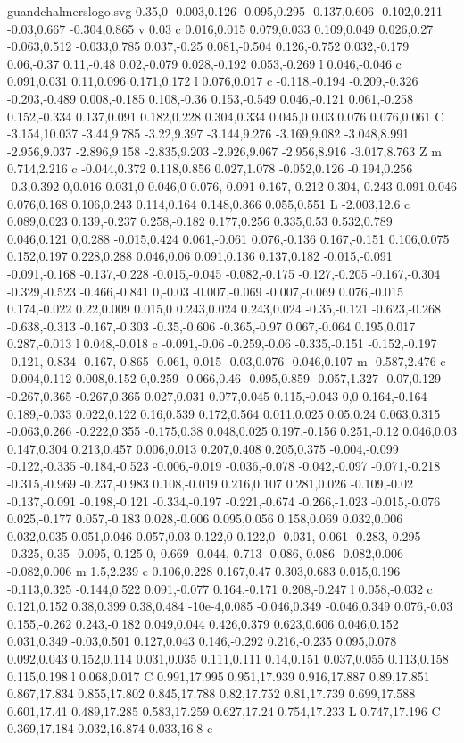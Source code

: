 \begin{filecontents}[noheader]{guandchalmerslogo.svg}
0.35,0 -0.003,0.126 -0.095,0.295 -0.137,0.606 -0.102,0.211 -0.03,0.667 -0.304,0.865 v 0.03 c 0.016,0.015 0.079,0.033 0.109,0.049 0.026,0.27 -0.063,0.512 -0.033,0.785 0.037,-0.25 0.081,-0.504 0.126,-0.752 0.032,-0.179 0.06,-0.37 0.11,-0.48 0.02,-0.079 0.028,-0.192 0.053,-0.269 l 0.046,-0.046 c 0.091,0.031 0.11,0.096 0.171,0.172 l 0.076,0.017 c -0.118,-0.194 -0.209,-0.326 -0.203,-0.489 0.008,-0.185 0.108,-0.36 0.153,-0.549 0.046,-0.121 0.061,-0.258 0.152,-0.334 0.137,0.091 0.182,0.228 0.304,0.334 0.045,0 0.03,0.076 0.076,0.061 C -3.154,10.037 -3.44,9.785 -3.22,9.397 -3.144,9.276 -3.169,9.082 -3.048,8.991 -2.956,9.037 -2.896,9.158 -2.835,9.203 -2.926,9.067 -2.956,8.916 -3.017,8.763 Z m 0.714,2.216 c -0.044,0.372 0.118,0.856 0.027,1.078 -0.052,0.126 -0.194,0.256 -0.3,0.392 0,0.016 0.031,0 0.046,0 0.076,-0.091 0.167,-0.212 0.304,-0.243 0.091,0.046 0.076,0.168 0.106,0.243 0.114,0.164 0.148,0.366 0.055,0.551 L -2.003,12.6 c 0.089,0.023 0.139,-0.237 0.258,-0.182 0.177,0.256 0.335,0.53 0.532,0.789 0.046,0.121 0,0.288 -0.015,0.424 0.061,-0.061 0.076,-0.136 0.167,-0.151 0.106,0.075 0.152,0.197 0.228,0.288 0.046,0.06 0.091,0.136 0.137,0.182 -0.015,-0.091 -0.091,-0.168 -0.137,-0.228 -0.015,-0.045 -0.082,-0.175 -0.127,-0.205 -0.167,-0.304 -0.329,-0.523 -0.466,-0.841 0,-0.03 -0.007,-0.069 -0.007,-0.069 0.076,-0.015 0.174,-0.022 0.22,0.009 0.015,0 0.243,0.024 0.243,0.024 -0.35,-0.121 -0.623,-0.268 -0.638,-0.313 -0.167,-0.303 -0.35,-0.606 -0.365,-0.97 0.067,-0.064 0.195,0.017 0.287,-0.013 l 0.048,-0.018 c -0.091,-0.06 -0.259,-0.06 -0.335,-0.151 -0.152,-0.197 -0.121,-0.834 -0.167,-0.865 -0.061,-0.015 -0.03,0.076 -0.046,0.107 m -0.587,2.476 c -0.004,0.112 0.008,0.152 0,0.259 -0.066,0.46 -0.095,0.859 -0.057,1.327 -0.07,0.129 -0.267,0.365 -0.267,0.365 0.027,0.031 0.077,0.045 0.115,-0.043 0,0 0.164,-0.164 0.189,-0.033 0.022,0.122 0.16,0.539 0.172,0.564 0.011,0.025 0.05,0.24 0.063,0.315 -0.063,0.266 -0.222,0.355 -0.175,0.38 0.048,0.025 0.197,-0.156 0.251,-0.12 0.046,0.03 0.147,0.304 0.213,0.457 0.006,0.013 0.207,0.408 0.205,0.375 -0.004,-0.099 -0.122,-0.335 -0.184,-0.523 -0.006,-0.019 -0.036,-0.078 -0.042,-0.097 -0.071,-0.218 -0.315,-0.969 -0.237,-0.983 0.108,-0.019 0.216,0.107 0.281,0.026 -0.109,-0.02 -0.137,-0.091 -0.198,-0.121 -0.334,-0.197 -0.221,-0.674 -0.266,-1.023 -0.015,-0.076 0.025,-0.177 0.057,-0.183 0.028,-0.006 0.095,0.056 0.158,0.069 0.032,0.006 0.032,0.035 0.051,0.046 0.057,0.03 0.122,0 0.122,0 -0.031,-0.061 -0.283,-0.295 -0.325,-0.35 -0.095,-0.125 0,-0.669 -0.044,-0.713 -0.086,-0.086 -0.082,0.006 -0.082,0.006 m 1.5,2.239 c 0.106,0.228 0.167,0.47 0.303,0.683 0.015,0.196 -0.113,0.325 -0.144,0.522 0.091,-0.077 0.164,-0.171 0.208,-0.247 l 0.058,-0.032 c 0.121,0.152 0.38,0.399 0.38,0.484 -10e-4,0.085 -0.046,0.349 -0.046,0.349 0.076,-0.03 0.155,-0.262 0.243,-0.182 0.049,0.044 0.426,0.379 0.623,0.606 0.046,0.152 0.031,0.349 -0.03,0.501 0.127,0.043 0.146,-0.292 0.216,-0.235 0.095,0.078 0.092,0.043 0.152,0.114 0.031,0.035 0.111,0.111 0.14,0.151 0.037,0.055 0.113,0.158 0.115,0.198 l 0.068,0.017 C 0.991,17.995 0.951,17.939 0.916,17.887 0.89,17.851 0.867,17.834 0.855,17.802 0.845,17.788 0.82,17.752 0.81,17.739 0.699,17.588 0.601,17.41 0.489,17.285 0.583,17.259 0.627,17.24 0.754,17.233 L 0.747,17.196 C 0.369,17.184 0.032,16.874 0.033,16.8 c 
\end{filecontents}
